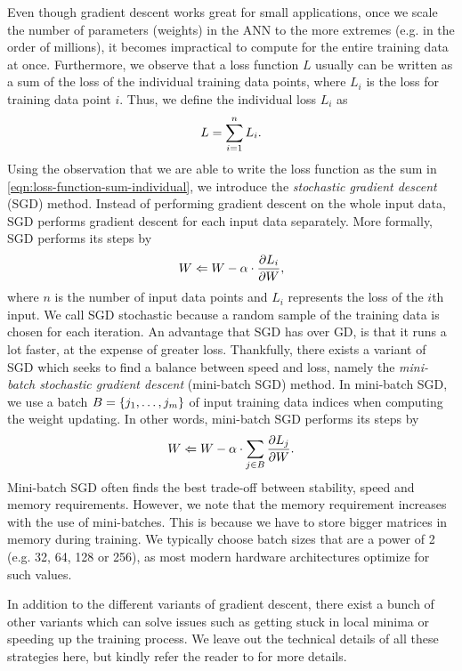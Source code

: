 Even though gradient descent works great for small applications, once we scale the number of parameters (weights) in the ANN to the more extremes (e.g. in the order of millions), it becomes impractical to compute for the entire training data at once. Furthermore, we observe that a loss function $L$ usually can be written as a sum of the loss of the individual training data points, where $L_i$ is the loss for training data point $i$. Thus, we define the individual loss $L_i$ as
\begin{align}
    \label{eqn:loss-function-sum-individual}
    L = \sum\limits_{i=1}^{n} L_i.
\end{align}
Using the observation that we are able to write the loss function as the sum in \cref{eqn:loss-function-sum-individual}, we introduce the \textit{stochastic gradient descent} (SGD) method. Instead of performing gradient descent on the whole input data, SGD performs gradient descent for each input data separately. More formally, SGD performs its steps by
\begin{align}
    \label{eqn:sgd}
    W \Leftarrow W - \alpha \cdot \frac{\partial L_i}{\partial W},
\end{align}
where $n$ is the number of input data points and $L_i$ represents the loss of the $i$th input. We call SGD stochastic because a random sample of the training data is chosen for each iteration. An advantage that SGD has over GD, is that it runs a lot faster, at the expense of greater loss. Thankfully, there exists a variant of SGD which seeks to find a balance between speed and loss, namely the \textit{mini-batch stochastic gradient descent} (mini-batch SGD) method. In mini-batch SGD, we use a batch $B=\left\{j_1, \ldots, j_m\right\}$ of input training data indices when computing the weight updating. In other words, mini-batch SGD performs its steps by
\begin{align}
    \label{eqn:mbsgd}
    W \Leftarrow W - \alpha \cdot \sum\limits_{j \in B}^{} \frac{\partial L_j}{\partial W}.
\end{align}
Mini-batch SGD often finds the best trade-off between stability, speed and memory requirements. However, we note that the memory requirement increases with the use of mini-batches. This is because we have to store bigger matrices in memory during training. We typically choose batch sizes that are a power of 2 (e.g. 32, 64, 128 or 256), as most modern hardware architectures optimize for such values.

In addition to the different variants of gradient descent, there exist a bunch of other variants which can solve issues such as getting stuck in local minima or speeding up the training process. We leave out the technical details of all these strategies here, but kindly refer the reader to \cite[Chapter 3.5]{Aggarwal18} for more details.

